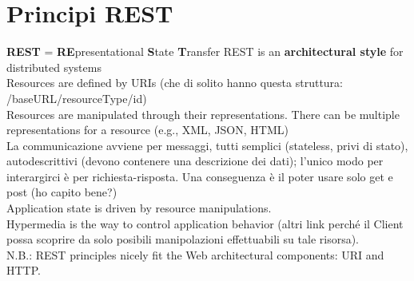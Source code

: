 \section{Principi REST}
\textbf{REST} = \textbf{RE}presentational \textbf{S}tate \textbf{T}ransfer
REST is an \textbf{architectural style} for distributed systems
\\Resources are defined by URIs (che di solito hanno questa struttura: /baseURL/resourceType/{id})
\\Resources are manipulated through their representations. There can be multiple representations for a resource (e.g., XML, JSON, HTML)
\\La communicazione avviene per messaggi, tutti semplici (stateless, privi di stato), autodescrittivi (devono contenere una descrizione dei dati); l'unico modo per interargirci è per richiesta-risposta. Una conseguenza è il poter usare solo get e post (ho capito bene?)
\\Application state is driven by resource manipulations.
\\Hypermedia is the way to control application behavior (altri link perché il Client possa scoprire da solo posibili manipolazioni effettuabili su tale risorsa).
\\N.B.: REST principles nicely fit the Web architectural components: URI and HTTP.

